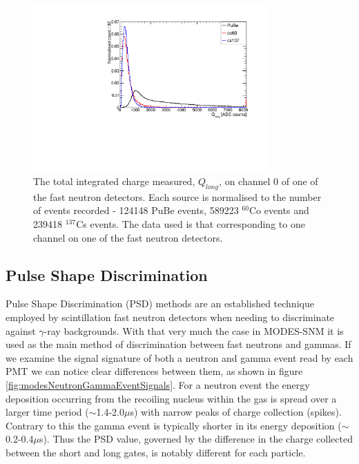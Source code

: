 \begin{figure}[htbp]
\begin{center}
\includegraphics[width=90mm]{Chapter8/figures/spectra_allSources_noCf252_linear.pdf}
\caption{The total integrated charge measured, $Q_{long}$, on channel 0 of one of the fast neutron detectors. Each source is normalised to the number of events recorded - 124148 PuBe events, 589223 $^{60}$Co events and 239418 $^{137}$Cs events. The data used is that corresponding to one channel on one of the fast neutron detectors.}
\label{fig:modesSourcesSpectraComparision}
\end{center}
\end{figure}

\subsection{Pulse Shape Discrimination}
Pulse Shape Discrimination (PSD) methods are an established technique employed by scintillation fast neutron detectors when needing to discriminate against $\gamma$-ray backgrounds. With that very much the case in MODES-SNM it is used as the main method of discrimination between fast neutrons and gammas. If we examine the signal signature of both a neutron and gamma event read by each PMT we can notice clear differences between them, as shown in figure \ref{fig:modesNeutronGammaEventSignals}. For a neutron event the energy deposition occurring from the recoiling nucleus within the gas is spread over a larger time period ($\sim$1.4-2.0$\mu$s) with narrow peaks of charge collection (spikes). Contrary to this the gamma event is typically shorter in its energy deposition ($\sim$0.2-0.4$\mu$s). Thus the PSD value, governed by the difference in the charge collected between the short and long gates, is notably different for each particle.


